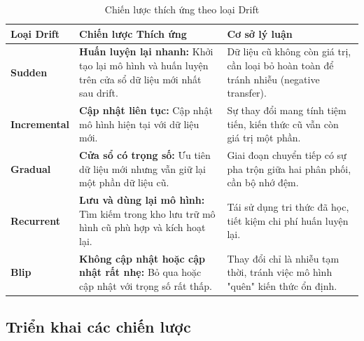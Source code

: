 \begin{table}[H]
	\centering
	\caption{Chiến lược thích ứng theo loại Drift}
	\label{tab:adaptation-strategies}
	\begin{tabular}{|l|p{5.5cm}|p{5cm}|}
		\hline
		\textbf{Loại Drift}  & \textbf{Chiến lược Thích ứng}                                                                                               & \textbf{Cơ sở lý luận}                                                                  \\
		\hline
		\textbf{Sudden}      & \textbf{Huấn luyện lại nhanh:} Khởi tạo lại mô hình và huấn luyện trên cửa sổ dữ liệu mới nhất sau drift.                & Dữ liệu cũ không còn giá trị, cần loại bỏ hoàn toàn để tránh nhiễu (negative transfer). \\
		\hline
		\textbf{Incremental} & \textbf{Cập nhật liên tục:} Cập nhật mô hình hiện tại với dữ liệu mới.                        & Sự thay đổi mang tính tiệm tiến, kiến thức cũ vẫn còn giá trị một phần.                 \\
		\hline
		\textbf{Gradual}     & \textbf{Cửa sổ có trọng số:} Ưu tiên dữ liệu mới nhưng vẫn giữ lại một phần dữ liệu cũ. & Giai đoạn chuyển tiếp có sự pha trộn giữa hai phân phối, cần bộ nhớ đệm.                \\
		\hline
		\textbf{Recurrent}   & \textbf{Lưu và dùng lại mô hình:} Tìm kiếm trong kho lưu trữ mô hình cũ phù hợp và kích hoạt lại.                            & Tái sử dụng tri thức đã học, tiết kiệm chi phí huấn luyện lại.                          \\
		\hline
		\textbf{Blip}        & \textbf{Không cập nhật hoặc cập nhật rất nhẹ:} Bỏ qua hoặc cập nhật với trọng số rất thấp.                                            & Thay đổi chỉ là nhiễu tạm thời, tránh việc mô hình "quên" kiến thức ổn định.            \\
		\hline
	\end{tabular}
\end{table}

\subsection{Triển khai các chiến lược}

